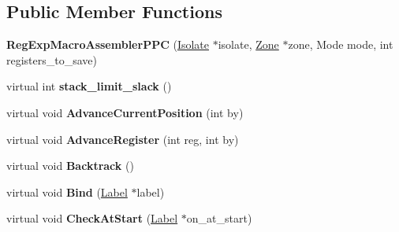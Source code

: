 \subsection*{Public Member Functions}
\begin{DoxyCompactItemize}
\item 
{\bfseries Reg\+Exp\+Macro\+Assembler\+P\+PC} (\hyperlink{classv8_1_1internal_1_1_isolate}{Isolate} $\ast$isolate, \hyperlink{classv8_1_1internal_1_1_zone}{Zone} $\ast$zone, Mode mode, int registers\+\_\+to\+\_\+save)\hypertarget{classv8_1_1internal_1_1_reg_exp_macro_assembler_p_p_c_aec5868d32cf4f274934958feb6fb7f3f}{}\label{classv8_1_1internal_1_1_reg_exp_macro_assembler_p_p_c_aec5868d32cf4f274934958feb6fb7f3f}

\item 
virtual int {\bfseries stack\+\_\+limit\+\_\+slack} ()\hypertarget{classv8_1_1internal_1_1_reg_exp_macro_assembler_p_p_c_a429088763fcc481a4e6e66fb108f90f1}{}\label{classv8_1_1internal_1_1_reg_exp_macro_assembler_p_p_c_a429088763fcc481a4e6e66fb108f90f1}

\item 
virtual void {\bfseries Advance\+Current\+Position} (int by)\hypertarget{classv8_1_1internal_1_1_reg_exp_macro_assembler_p_p_c_aea271e9d8f50c6127b5ac05770003bbd}{}\label{classv8_1_1internal_1_1_reg_exp_macro_assembler_p_p_c_aea271e9d8f50c6127b5ac05770003bbd}

\item 
virtual void {\bfseries Advance\+Register} (int reg, int by)\hypertarget{classv8_1_1internal_1_1_reg_exp_macro_assembler_p_p_c_ab900592c59291eb3bd395581de467f90}{}\label{classv8_1_1internal_1_1_reg_exp_macro_assembler_p_p_c_ab900592c59291eb3bd395581de467f90}

\item 
virtual void {\bfseries Backtrack} ()\hypertarget{classv8_1_1internal_1_1_reg_exp_macro_assembler_p_p_c_ac49f18f6f71645060cf488417fa31d7e}{}\label{classv8_1_1internal_1_1_reg_exp_macro_assembler_p_p_c_ac49f18f6f71645060cf488417fa31d7e}

\item 
virtual void {\bfseries Bind} (\hyperlink{classv8_1_1internal_1_1_label}{Label} $\ast$label)\hypertarget{classv8_1_1internal_1_1_reg_exp_macro_assembler_p_p_c_afebbd8dcd5b125274fe5c6a1dd8f91ae}{}\label{classv8_1_1internal_1_1_reg_exp_macro_assembler_p_p_c_afebbd8dcd5b125274fe5c6a1dd8f91ae}

\item 
virtual void {\bfseries Check\+At\+Start} (\hyperlink{classv8_1_1internal_1_1_label}{Label} $\ast$on\+\_\+at\+\_\+start)\hypertarget{classv8_1_1internal_1_1_reg_exp_macro_assembler_p_p_c_a40341a7d034d1f17e803eae8fd22644e}{}\label{classv8_1_1internal_1_1_reg_exp_macro_assembler_p_p_c_a40341a7d034d1f17e803eae8fd22644e}


\end{DoxyCompactItemize}
